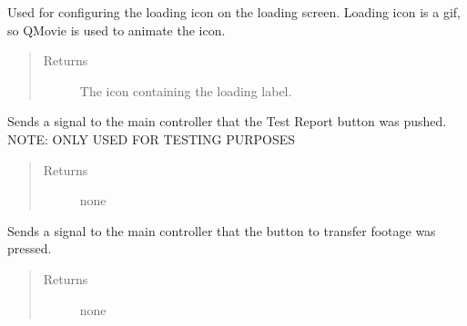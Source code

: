 \documentclass[letterpaper,10pt,english]{sphinxmanual}
\begin{document}
\begin{fulllineitems}
\begin{fulllineitems}
\label{\detokenize{index:src.Views.View_LoadingScreen.LoadingWindow.setupLoadingIcon}}
Used for configuring the loading icon on the loading screen.
Loading icon is a gif, so QMovie is used to animate the icon.
\begin{quote}\begin{description}
\item[{Returns}] \leavevmode
The icon containing the loading label.

\end{description}\end{quote}

\end{fulllineitems}


\begin{fulllineitems}
\label{\detokenize{index:src.Views.View_LoadingScreen.LoadingWindow.signalTestReport}}
Sends a signal to the main controller that the Test Report button was pushed.
NOTE: ONLY USED FOR TESTING PURPOSES
\begin{quote}\begin{description}
\item[{Returns}] \leavevmode
none

\end{description}\end{quote}

\end{fulllineitems}


\begin{fulllineitems}
\label{\detokenize{index:src.Views.View_LoadingScreen.LoadingWindow.signalTransferFootage}}
Sends a signal to the main controller that the button to transfer footage was pressed.
\begin{quote}\begin{description}
\item[{Returns}] \leavevmode
none

\end{description}\end{quote}

\end{fulllineitems}


\end{fulllineitems}
\end{document}
